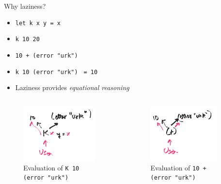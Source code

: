 \documentclass[8pt]{beamer}
\newcommand{\hs}[1]{\texttt{#1}}
\begin{document}
\begin{frame}[fragile]{Why laziness?}
    \begin{itemize}
        \item \hs{let k x y = x} \pause
        \item \hs{k 10 20} \pause
        \item \hs{10 + (error "urk")} \pause
        \item \hs{k 10 (error "urk")} \pause \hs{ = 10}
        \item Laziness provides \emph{equational reasoning}
    \end{itemize}

    \pause
    \begin{columns}
    \begin{column}{0.48\textwidth}
    \begin{figure}
    \includegraphics[height = 3cm]{./k-10-err.png}
    \caption{Evaluation of \hs{K 10 (error "urk")}}
    \end{figure}
    \end{column}
    \pause
    \begin{column}{0.48\textwidth}
    \begin{figure}
    \includegraphics[height = 3cm]{./plus-10-err.png}
    \caption{Evaluation of \hs{10 + (error "urk")}}
    \end{figure}
    \end{column}
    \end{columns}
\end{frame}
\end{document}
